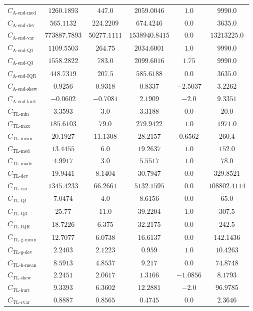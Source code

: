 \documentclass{standalone}
\newcommand{\lastmedianname}{\text{A-end-med}}
\newcommand{\lastmedian}{C_{\lastmedianname}}
\newcommand{\lastdevname}{\text{A-end-dev}}
\newcommand{\lastdev}{C_{\lastdevname}}
\newcommand{\lastvarname}{\text{A-end-var}}
\newcommand{\lastvar}{C_{\lastvarname}}
\newcommand{\lastqonename}{\text{A-end-Q1}}
\newcommand{\lastqone}{C_{\lastqonename}}
\newcommand{\lastqthreename}{\text{A-end-Q3}}
\newcommand{\lastqthree}{C_{\lastqthreename}}
\newcommand{\lastiqrname}{\text{A-end-IQR}}
\newcommand{\lastiqr}{C_{\lastiqrname}}
\newcommand{\lastskewname}{\text{A-end-skew}}
\newcommand{\lastskew}{C_{\lastskewname}}
\newcommand{\lastkurtname}{\text{A-end-kurt}}
\newcommand{\lastkurt}{C_{\lastkurtname}}
\newcommand{\tlminname}{\text{TL-min}}
\newcommand{\tlmin}{C_{\tlminname}}
\newcommand{\tlavgname}{\text{TL-mean}}
\newcommand{\tlavg}{C_{\tlavgname}}
\newcommand{\tlmaxname}{\text{TL-max}}
\newcommand{\tlmax}{C_{\tlmaxname}}
\newcommand{\tlmedname}{\text{TL-med}}
\newcommand{\tlmed}{C_{\tlmedname}}
\newcommand{\tlmodename}{\text{TL-mode}}
\newcommand{\tlmode}{C_{\tlmodename}}
\newcommand{\tldevname}{\text{TL-dev}}
\newcommand{\tldev}{C_{\tldevname}}
\newcommand{\tlvarname}{\text{TL-var}}
\newcommand{\tlvar}{C_{\tlvarname}}
\newcommand{\tlqonename}{\text{TL-Q1}}
\newcommand{\tlqone}{C_{\tlqonename}}
\newcommand{\tlqthreename}{\text{TL-Q3}}
\newcommand{\tlqthree}{C_{\tlqthreename}}
\newcommand{\tliqrname}{\text{TL-IQR}}
\newcommand{\tliqr}{C_{\tliqrname}}
\newcommand{\tlgmeanname}{\text{TL-g-mean}}
\newcommand{\tlgmean}{C_{\tlgmeanname}}
\newcommand{\tlgdevname}{\text{TL-g-dev}}
\newcommand{\tlgdev}{C_{\tlgdevname}}
\newcommand{\tlhmeanname}{\text{TL-h-mean}}
\newcommand{\tlhmean}{C_{\tlhmeanname}}
\newcommand{\tlskewnessname}{\text{TL-skew}}
\newcommand{\tlskewness}{C_{\tlskewnessname}}
\newcommand{\tlkurtosisname}{\text{TL-kurt}}
\newcommand{\tlkurtosis}{C_{\tlkurtosisname}}
\newcommand{\tlcvariationname}{\text{TL-cvar}}
\newcommand{\tlcvariation}{C_{\tlcvariationname}}
\begin{document}
\begin{tabular}{lccccc}
$\lastmedian$ & $1260.1893$ & $447.0$ & $2059.0046$ & $1.0$ & $9990.0$ \\ 
$\lastdev$ & $565.1132$ & $224.2209$ & $674.4246$ & $0.0$ & $3635.0$ \\ 
$\lastvar$ & $773887.7893$ & $50277.1111$ & $1538940.8415$ & $0.0$ & $13213225.0$ \\ 
$\lastqone$ & $1109.5503$ & $264.75$ & $2034.6001$ & $1.0$ & $9990.0$ \\ 
$\lastqthree$ & $1558.2822$ & $783.0$ & $2099.6016$ & $1.75$ & $9990.0$ \\ 
$\lastiqr$ & $448.7319$ & $207.5$ & $585.6188$ & $0.0$ & $3635.0$ \\ 
$\lastskew$ & $0.9256$ & $0.9318$ & $0.8337$ & $-2.5037$ & $3.2262$ \\ 
$\lastkurt$ & $-0.0602$ & $-0.7081$ & $2.1909$ & $-2.0$ & $9.3351$ \\ 
$\tlmin$ & $3.3593$ & $3.0$ & $3.3188$ & $0.0$ & $20.0$ \\ 
$\tlmax$ & $185.6103$ & $79.0$ & $279.9422$ & $1.0$ & $1971.0$ \\ 
$\tlavg$ & $20.1927$ & $11.1308$ & $28.2157$ & $0.6562$ & $260.4$ \\ 
$\tlmed$ & $13.4455$ & $6.0$ & $19.2637$ & $1.0$ & $152.0$ \\ 
$\tlmode$ & $4.9917$ & $3.0$ & $5.5517$ & $1.0$ & $78.0$ \\ 
$\tldev$ & $19.9441$ & $8.1404$ & $30.7947$ & $0.0$ & $329.8521$ \\ 
$\tlvar$ & $1345.4233$ & $66.2661$ & $5132.1595$ & $0.0$ & $108802.4114$ \\ 
$\tlqone$ & $7.0474$ & $4.0$ & $8.6156$ & $0.0$ & $65.0$ \\ 
$\tlqthree$ & $25.77$ & $11.0$ & $39.2204$ & $1.0$ & $307.5$ \\ 
$\tliqr$ & $18.7226$ & $6.375$ & $32.2175$ & $0.0$ & $242.5$ \\ 
$\tlgmean$ & $12.7077$ & $6.0738$ & $16.6137$ & $0.0$ & $142.1436$ \\ 
$\tlgdev$ & $2.2403$ & $2.1223$ & $0.959$ & $1.0$ & $10.4263$ \\ 
$\tlhmean$ & $8.5913$ & $4.8537$ & $9.217$ & $0.0$ & $74.8748$ \\ 
$\tlskewness$ & $2.2451$ & $2.0617$ & $1.3166$ & $-1.0856$ & $8.1793$ \\ 
$\tlkurtosis$ & $9.3393$ & $6.3602$ & $12.2881$ & $-2.0$ & $96.9785$ \\ 
$\tlcvariation$ & $0.8887$ & $0.8565$ & $0.4745$ & $0.0$ & $2.3646$ \\ 

\end{tabular}
\end{document}
